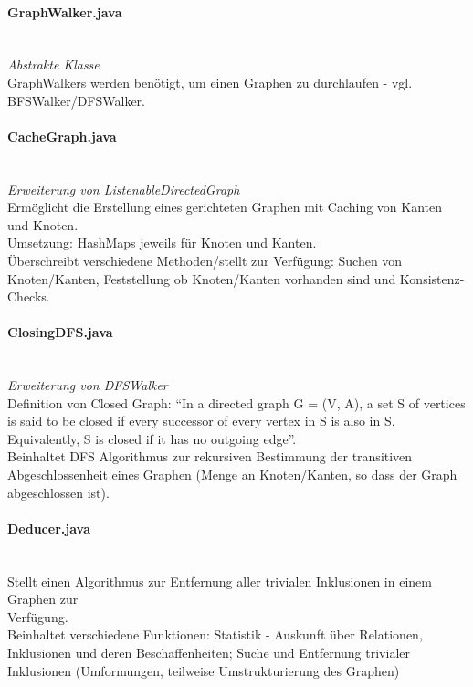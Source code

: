 \documentclass[10pt,a4paper]{article}
\begin{document}
\paragraph{GraphWalker.java}\ \\
\emph{Abstrakte Klasse}\\
GraphWalkers werden benötigt, um einen Graphen zu durchlaufen - vgl. BFSWalker/DFSWalker. \\

\paragraph{CacheGraph.java}\ \\
\emph{Erweiterung von ListenableDirectedGraph}\\
Ermöglicht die Erstellung eines gerichteten Graphen mit Caching von Kanten und Knoten.\\
Umsetzung: HashMaps jeweils für Knoten und Kanten.\\
Überschreibt verschiedene Methoden/stellt zur Verfügung: Suchen von Knoten/Kanten, Feststellung ob Knoten/Kanten vorhanden sind und Konsistenz-Checks.\\

\paragraph{ClosingDFS.java}\ \\
\emph{Erweiterung von DFSWalker}\\
Definition von Closed Graph: "`In a directed graph G = (V, A), a set S of vertices is said to be closed if every successor of every vertex in S is also in S. Equivalently, S is closed if it has no outgoing edge"'.\\
Beinhaltet DFS Algorithmus zur rekursiven Bestimmung der transitiven Abgeschlossenheit eines Graphen (Menge an Knoten/Kanten, so dass der Graph abgeschlossen ist).\\

\paragraph{Deducer.java}\ \\
Stellt einen Algorithmus zur Entfernung aller trivialen Inklusionen in einem Graphen zur \\Verfügung.\\
Beinhaltet verschiedene Funktionen: Statistik - Auskunft über Relationen, Inklusionen und deren Beschaffenheiten; Suche und Entfernung trivialer Inklusionen (Umformungen, teilweise Umstrukturierung des Graphen)\\
\end{document}
